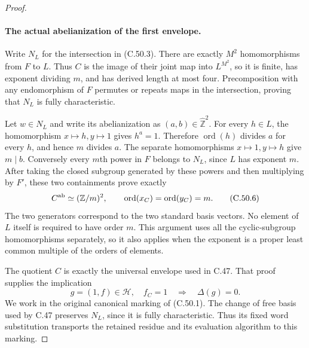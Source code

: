 \begin{proof}
\paragraph{The actual abelianization of the first envelope.}
Write $N_L$ for the intersection in (C.50.3).
There are exactly $M^2$ homomorphisms from $F$ to $L$.
Thus $C$ is the image of their joint map into $L^{M^2}$, so it is
finite, has exponent dividing $m$, and has derived length at most
four. Precomposition with any endomorphism of $F$ permutes or
repeats maps in the intersection, proving that $N_L$ is fully
characteristic.

Let $w\in N_L$ and write its abelianization as $(a,b)\in
\widehat{\mathbb Z}^2$. For every $h\in L$, the homomorphism
$x\mapsto h,y\mapsto1$ gives $h^a=1$. Therefore
$\operatorname{ord}(h)$ divides $a$ for every $h$, and hence
$m$ divides $a$. The separate homomorphisms
$x\mapsto1,y\mapsto h$ give $m\mid b$.
Conversely every $m$th power in $F$ belongs to $N_L$, since
$L$ has exponent $m$. After taking the closed subgroup generated
by these powers and then multiplying by $F'$, these two containments
prove exactly
\[
                     C^{\rm ab}\simeq (\mathbb Z/m)^2,
       \qquad \operatorname{ord}(x_C)
              =\operatorname{ord}(y_C)=m.             \tag{C.50.6}
\]
The two generators correspond to the two standard basis vectors.
No element of $L$ itself is required to have order $m$.
This argument uses all the cyclic-subgroup homomorphisms separately,
so it also applies when the exponent is a proper least common multiple
of the orders of elements.

The quotient $C$ is exactly the universal envelope used in C.47.
That proof supplies the implication
\[
          g=(1,f)\in\mathcal H,\quad f_C=1
                         \quad\Longrightarrow\quad \Delta(g)=0.
                                                               \tag{C.50.7}
\]
We work in the original canonical marking of (C.50.1).
The change of free basis used by C.47 preserves $N_L$, since it
is fully characteristic. Thus its fixed word substitution transports
the retained residue and its evaluation algorithm to this marking.


\end{proof}
